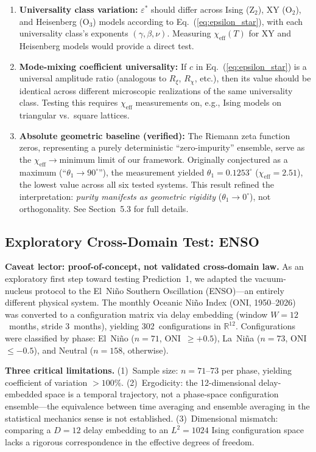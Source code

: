\documentclass[aps,prl,twocolumn,superscriptaddress,byrevtex]{article}
\begin{document}
\begin{enumerate}
\item \textbf{Universality class variation:} $\varepsilon^*$ should differ across Ising (Z$_2$), XY (O$_2$), and Heisenberg (O$_3$) models according to Eq.~(\ref{eq:epsilon_star}), with each universality class's exponents $(\gamma, \beta, \nu)$. Measuring $\chi_{\text{eff}}(T)$ for XY and Heisenberg models would provide a direct test.

\item \textbf{Mode-mixing coefficient universality:} If $c$ in Eq.~(\ref{eq:epsilon_star}) is a universal amplitude ratio (analogous to $R_\xi$, $R_\chi$, etc.), then its value should be identical across different microscopic realizations of the same universality class. Testing this requires $\chi_{\text{eff}}$ measurements on, e.g., Ising models on triangular vs.\ square lattices.

\item \textbf{Absolute geometric baseline (verified):} The Riemann zeta function zeros, representing a purely deterministic ``zero-impurity'' ensemble, serve as the $\chi_{\text{eff}} \to \text{minimum}$ limit of our framework. Originally conjectured as a maximum (``$\theta_1 \to 90^\circ$''), the measurement yielded $\theta_1 = 0.1253^\circ$ ($\chi_{\text{eff}} = 2.51$), the lowest value across all six tested systems. This result refined the interpretation: \emph{purity manifests as geometric rigidity} ($\theta_1 \to 0^\circ$), not orthogonality. See Section~5.3 for full details.
\end{enumerate}

\subsection{Exploratory Cross-Domain Test: ENSO}

\textbf{Caveat lector: proof-of-concept, not validated cross-domain law.} As an exploratory first step toward testing Prediction~1, we adapted the vacuum-nucleus protocol to the El~Ni\~{n}o Southern Oscillation (ENSO)---an entirely different physical system. The monthly Oceanic Ni\~{n}o Index (ONI, 1950--2026) was converted to a configuration matrix via delay embedding (window $W = 12$~months, stride 3~months), yielding 302~configurations in $\mathbb{R}^{12}$. Configurations were classified by phase: El~Ni\~{n}o ($n=71$, ONI~$\geq +0.5$), La~Ni\~{n}a ($n=73$, ONI~$\leq -0.5$), and Neutral ($n=158$, otherwise).

\textbf{Three critical limitations.} (1)~Sample size: $n=71$--$73$ per phase, yielding coefficient of variation $>100\%$. (2)~Ergodicity: the 12-dimensional delay-embedded space is a temporal trajectory, not a phase-space configuration ensemble---the equivalence between time averaging and ensemble averaging in the statistical mechanics sense is not established. (3)~Dimensional mismatch: comparing a $D=12$ delay embedding to an $L^2=1024$ Ising configuration space lacks a rigorous correspondence in the effective degrees of freedom.
\end{document}
